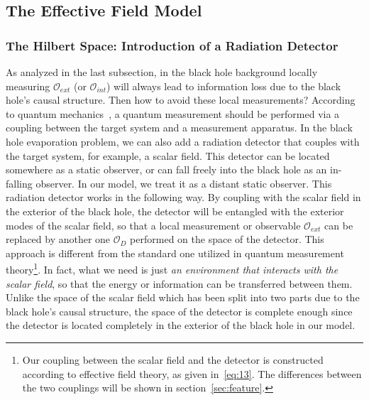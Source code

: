 \documentclass[12pt,a4paper]{article}
\begin{document}
\subsection{The Effective Field Model}
\label{sec:model}

\subsubsection{The Hilbert Space: Introduction of a Radiation Detector}
\label{sec:hilbert}

As analyzed in the last subsection, in the black hole background locally measuring $\mathcal{O}_{ext}$ (or $\mathcal{O}_{int}$) will always lead to information loss due to the black hole's causal structure. Then how to avoid these local measurements? According to quantum mechanics~\cite{i}, a quantum measurement should be performed via a coupling between the target system and a measurement apparatus. In the black hole evaporation problem, we can also add a radiation detector that couples with the target system, for example, a scalar field. This detector can be located somewhere as a static observer, or can fall freely into the black hole as an in-falling observer. In our model, we treat it as a distant static observer.
This radiation detector works in the following way. By coupling with the scalar field in the exterior of the black hole, the detector will be entangled with the exterior modes of the scalar field, so that a local measurement or observable $\mathcal{O}_{ext}$ can be replaced by another one $\mathcal{O}_{D}$ performed on the space of the detector. This approach is different from the standard one utilized in quantum measurement theory\footnote{Our coupling between the scalar field and the detector is constructed according to effective field theory, as given in~\eqref{eq:13}. The differences between the two couplings will be shown in section~\ref{sec:feature}.}. In fact, what we need is just \emph{an environment that interacts with the scalar field}, so that the energy or information can be transferred between them. Unlike the space of the scalar field which has been split into two parts due to the black hole's causal structure, the space of the detector is complete enough since the detector is located completely in the exterior of the black hole in our model.
\end{document}
